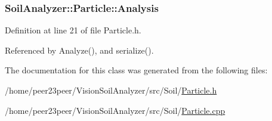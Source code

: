 \subsubsection[{Analysis}]{ Soil\+Analyzer\+::\+Particle\+::\+Analysis}\label{class_soil_analyzer_1_1_particle_a4df8d4d8fb130bce05fef5d4601ef89e}


Definition at line 21 of file Particle.\+h.



Referenced by Analyze(), and serialize().



The documentation for this class was generated from the following files\+:\begin{DoxyCompactItemize}
\item 
/home/peer23peer/\+Vision\+Soil\+Analyzer/src/\+Soil/\hyperlink{_particle_8h}{Particle.\+h}\item 
/home/peer23peer/\+Vision\+Soil\+Analyzer/src/\+Soil/\hyperlink{_particle_8cpp}{Particle.\+cpp}\end{DoxyCompactItemize}
